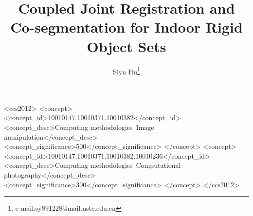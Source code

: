 \documentclass{acmsiggraph}
\title{Coupled Joint Registration and Co-segmentation for Indoor Rigid Object Sets}
\author{Siyu Hu\thanks{e-mail:sy891228@mail.ustc.edu.cn}}
\begin{document}


\maketitle

\begin{abstract}


%
%

\end{abstract}

%
%
\begin{CCSXML}
<ccs2012>
<concept>
<concept_id>10010147.10010371.10010382</concept_id>
<concept_desc>Computing methodologies~Image manipulation</concept_desc>
<concept_significance>500</concept_significance>
</concept>
<concept>
<concept_id>10010147.10010371.10010382.10010236</concept_id>
<concept_desc>Computing methodologies~Computational photography</concept_desc>
<concept_significance>300</concept_significance>
</concept>
</ccs2012>
\end{CCSXML}


%
%

\end{document}
